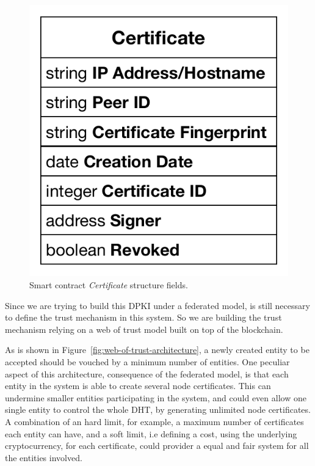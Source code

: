 \begin{figure}
  \centering
  \includegraphics[scale=0.5]{Figures/certificate-structure.pdf}
  \caption{Smart contract \textit{Certificate} structure fields.}
\label{fig:certificate-structure}
\end{figure}

Since we are trying to build this \ac{DPKI} under a federated model, is still necessary to define the trust mechanism in this system.
So we are building the trust mechanism relying on a web of trust model built on top of the blockchain.

As is shown in Figure~\ref{fig:web-of-trust-architecture}, a newly created entity to be accepted should be vouched by a minimum number of entities.
One peculiar aspect of this architecture, consequence of the federated model, is that each entity in the system is able to create several node certificates.
This can undermine smaller entities participating in the system, and could even allow one single entity to control the whole \ac{DHT}, by generating unlimited node certificates.
A combination of an hard limit, for example, a maximum number of certificates each entity can have, and a soft limit, i.e defining a cost, using the underlying cryptocurrency, for each certificate, could provider a equal and fair system for all the entities involved.

